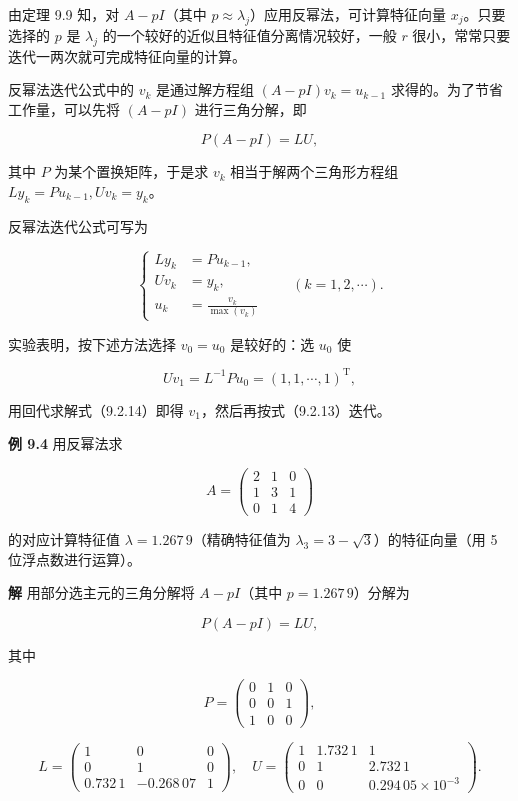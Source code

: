\documentclass[
  10pt,
  fontset=fandol]{ctexart}
\begin{document}
由定理 9.9 知，对 \(A-pI\)（其中 \(p\approx\lambda_j\)）应用反幂法，可计算特征向量 \(x_j\)。只要选择的 \(p\) 是 \(\lambda_j\) 的一个较好的近似且特征值分离情况较好，一般 \(r\) 很小，常常只要迭代一两次就可完成特征向量的计算。

反幂法迭代公式中的 \(v_k\) 是通过解方程组 \((A-pI)v_k=u_{k-1}\) 求得的。为了节省工作量，可以先将 \((A-pI)\) 进行三角分解，即

\[
P(A-pI)=LU,
\]

其中 \(P\) 为某个置换矩阵，于是求 \(v_k\) 相当于解两个三角形方程组 \(Ly_k=Pu_{k-1},Uv_k=y_k\)。

反幂法迭代公式可写为

\[
\left\{
\begin{aligned}
Ly_k&=Pu_{k-1},\\
Uv_k&=y_k,\\
u_k&=\frac{v_k}{\max(v_k)}
\end{aligned}
\right.\qquad(k=1,2,\cdots).
\tag{9.2.13}
\]

实验表明，按下述方法选择 \(v_0=u_0\) 是较好的：选 \(u_0\) 使

\[
Uv_1=L^{-1}Pu_0=(1,1,\cdots,1)^{\mathrm T},
\tag{9.2.14}
\]

用回代求解式（9.2.14）即得 \(v_1\)，然后再按式（9.2.13）迭代。

\textbf{例 9.4} 用反幂法求

\[
A=\begin{pmatrix}
2&1&0\\
1&3&1\\
0&1&4
\end{pmatrix}
\]

的对应计算特征值 \(\lambda=1.267\,9\)（精确特征值为 \(\lambda_3=3-\sqrt3\)）的特征向量（用 5 位浮点数进行运算）。

\textbf{解} 用部分选主元的三角分解将 \(A-pI\)（其中 \(p=1.267\,9\)）分解为

\[
P(A-pI)=LU,
\]

其中

\[
P=\begin{pmatrix}
0&1&0\\
0&0&1\\
1&0&0
\end{pmatrix},
\]

\[
L=\begin{pmatrix}
1&0&0\\
0&1&0\\
0.732\,1&-0.268\,07&1
\end{pmatrix},\quad
U=\begin{pmatrix}
1&1.732\,1&1\\
0&1&2.732\,1\\
0&0&0.294\,05\times10^{-3}
\end{pmatrix}.
\]
\end{document}
